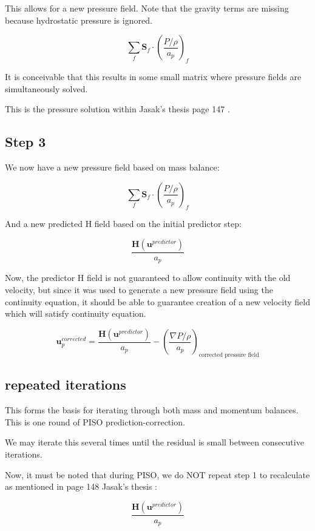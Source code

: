 \documentclass[masters]{ucbthesis}
\renewcommand{\_}{\kern-1.5pt\textunderscore\kern-1.5pt}
\begin{document}
This allows for a new pressure field. Note that the gravity terms are missing 
because hydrostatic pressure is ignored.

$$
\sum_f \textbf{S}_f \cdot
\left( 
	\frac{P/\rho}{a_p}
\right)_f
$$

It is conceivable that this results in some small matrix where 
pressure fields are simultaneously solved.

This is the pressure solution within Jasak's thesis page 147 \citep{jasak1996error}.

\subsection{Step 3}

We now have a new pressure field based on mass balance:

$$
\sum_f \textbf{S}_f \cdot
\left( 
	\frac{P/\rho}{a_p}
\right)_f
$$

And a new predicted H field based on the initial predictor step:

$$
\frac{\textbf{H}(\textbf{u}^{predictor})}{a_p}
$$

Now, the predictor H field is not guaranteed to allow continuity with 
the old velocity, but since it was used to generate a new pressure 
field using the continuity equation, it should be able to guarantee 
creation of a new velocity field which will satisfy continuity equation.


\begin{equation}
	\textbf{u}_p^{corrected} = \frac{\textbf{H}(\textbf{u}^{predictor})}{a_p}
	- \left(\frac{\nabla P/\rho}{a_p}\right)_\text{corrected pressure field}
\end{equation}

\subsection{repeated iterations}
This forms the basis for iterating through both mass and momentum balances.
This is one round of PISO prediction-correction. 

We may iterate this several times until the residual is small between 
consecutive iterations. 

Now, it must be noted that during PISO, we do NOT repeat step 1 
to recalculate as mentioned in page 148 Jasak's thesis \cite{jasak1996error}:

\begin{equation*}
	\frac{\textbf{H}(\textbf{u}^{predictor})}{a_p}
\end{equation*}
\end{document}
